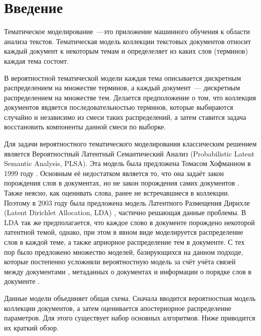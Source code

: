 \documentclass[12pt, twoside]{article}
\begin{document}
\newcommand{\norm}{\mathop{\mathsf{norm}}\limits}

\section{Введение}

Тематическое моделирование~---это приложение машинного обучения к области анализа текстов. Тематическая модель коллекции текстовых документов относит каждый документ к некоторым темам и определеляет из каких слов (терминов) каждая тема состоит.

В вероятностной тематической модели каждая тема описывается дискретным распределением на множестве терминов,  а каждый документ~--- дискретным распределением на множестве тем. Делается предположение о том, что коллекция документов явдяется последовательностью терминов, которые выбираются случайно и независимо из смеси таких распределений, а затем ставится задача восстановить компоненты данной смеси по выборке.

Для  задачи вероятностного тематического моделирования  классическим решением является Вероятностный Латентный Семантический Анализ (Probabilistic Latent Semantic Analysis, PLSA). Эта модель  была предложена Томасом Хофманном в 1999 году \cite{hofmann1999probabilistic}. Основным её недостатком является то, что она задаёт закон порождения слов в документах, но не закон порождения самих документов \cite{daud2010knowledge}. Также  неясно, как оценивать слова, ранее не встречавшиеся в коллекции. Поэтому в 2003 году была предложена модель Латентного Размещения Дирихле (Latent Dirichlet Allocation, LDA) \cite{blei2003latent}, частично решающая данные проблемы. В LDA так же предполагается, что каждое слово в документе порождено некоторой латентной темой, однако, при этом в явном виде моделируется распределение слов в каждой теме, а также априорное
распределение тем в документе. С тех пор было предложено множество моделей, базирующихся на данном подходе, которые постепенно усложняли вероятностную модель за счёт учёта связей между документами \cite{cohn2001missing,mccallum2005author,nallapati2008link}, метаданных о документах \cite{steyvers2004probabilistic} и информации о порядке слов в документе \cite{gruber2007hidden,wallach2006topic}.

Данные модели объединяет общая схема. Сначала вводится вероятностная модель коллекции документов, а затем оценивается  апостериорное распределение  параметров. Для этого существует набор основных алгоритмов. Ниже приводится их краткий обзор.
\end{document}
